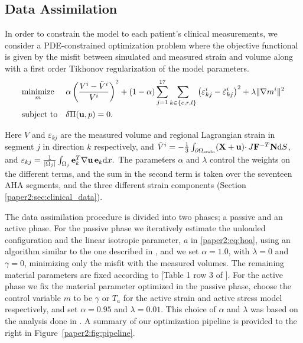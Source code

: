 \subsection{Data Assimilation}
In order to constrain the model to each patient's clinical measurements, we
consider a PDE-constrained optimization problem where
the objective functional is given by the misfit between
simulated and measured strain and volume along with a first order Tikhonov regularization of the
model parameters.
\begin{equation}
  \begin{aligned}
    \label{paper2:eq:pde_opt}
    & \underset{m}{\text{minimize}}
    & &  \alpha \left( \frac{V^i - \tilde{V}^i}{V^i} \right)^2
    + (1-\alpha)  \sum_{j= 1}^{17} \sum_{k \in \{c,r,l\}}  \left( \varepsilon_{kj}^i
      -  \tilde{\varepsilon}_{kj}^i \right)^2
    + \lambda \| \nabla m^i \|^2 \\
    & \text{subject to}
    & & \delta \Pi(\mathbf{u}, p) = 0.
  \end{aligned}
\end{equation}


Here $V$ and $\varepsilon_{kj}$ are the measured volume and regional Lagrangian strain in
segment $j$ in direction $k$ respectively, and $\tilde{V}^i =
-\frac{1}{3} \int_{\partial \Omega_{\text{endo}}} (\mathbf{X} + \mathbf{u})
\cdotp J\mathbf{F}^{-T}\mathbf{N}  \mathrm{d}S$,  and $\varepsilon_{kj} =
\frac{1}{|\Omega_j|}\int_{\Omega_j}  \mathbf{e}_k^T \nabla \mathbf{u} \,
\mathbf{e}_k  \mathrm{d}x.$ 
The parameters $\alpha$ and $\lambda$
control the weights on the different terms, and the sum in the second
term is taken over the seventeen AHA
segments, and the three different strain components (Section \ref{paper2:sec:clinical_data}).


The data assimilation procedure is divided into two phases; a passive
and an active phase. For the passive phase we iteratively
  estimate the unloaded configuration and the linear isotropic parameter, $a$ in
\eqref{paper2:eq:hoa}, using an algorithm similar to the one described in
\cite{nikou2016effects}, and we set $\alpha= 1.0$,  with $\lambda = 0$ and
$\gamma = 0$, minimizing only the misfit with the measured volumes. The
remaining material parameters are fixed according to [Table 1 row 3 of
\cite{holzapfel2009constitutive}]. For the active phase we fix the material parameter optimized in the
passive phase, choose the control variable $m$ to be $\gamma$ or
$T_a$ for the active strain and active stress model respectively, and
set $\alpha = 0.95$ and $\lambda = 0.01$. This choice of $\alpha$ and
$\lambda$ was based on the analysis done in \cite{balaban}. A summary
of our optimization pipeline is provided to the right in
Figure~\ref{paper2:fig:pipeline}.





